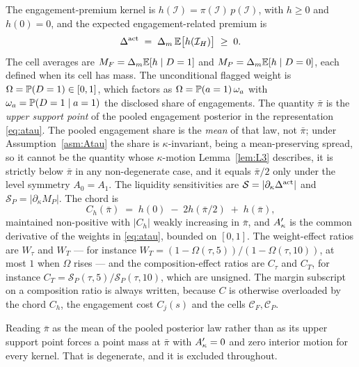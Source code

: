 \begin{definition}
\label{def:premium}
The engagement-premium kernel is $h(\mathcal I) = \pi(\mathcal I)\,p(\mathcal I)$, with $h \ge 0$ and
$h(0) = 0$, and the expected engagement-related premium is
\begin{equation}
\label{eq:Dact}
\Delta^{\mathrm{act}} \;=\; \Delta_m\,\mathbb{E}\bigl[h(\mathcal I_H)\bigr] \;\ge\; 0.
\end{equation}
The cell averages are $M_F = \Delta_m\mathbb{E}[h \mid D=1]$ and $M_P = \Delta_m\mathbb{E}[h \mid D=0]$, each
defined when its cell has mass. The unconditional flagged weight is $\Omega = \mathbb{P}(D=1) \in [0,1]$,
which factors as $\Omega = \mathbb{P}(a=1)\,\omega_a$ with $\omega_a = \mathbb{P}(D=1 \mid a=1)$ the disclosed
share of engagements. The quantity $\bar\pi$ is the \emph{upper support point} of the pooled
engagement posterior in the representation \eqref{eq:atau}. The pooled engagement share is the
\emph{mean} of that law, not $\bar\pi$; under Assumption~\ref{asm:Atau} the share is
$\kappa$-invariant, being a mean-preserving spread, so it cannot be the quantity whose
$\kappa$-motion Lemma~\ref{lem:L3} describes, it is strictly below $\bar\pi$ in any non-degenerate
case, and it equals $\bar\pi/2$ only under the level symmetry $A_0 = A_1$. The liquidity
sensitivities are $\mathcal S = |\partial_\kappa\Delta^{\mathrm{act}}|$ and $\mathcal S_P =
|\partial_\kappa M_P|$. The chord is
\begin{equation}
\label{eq:chord}
C_h(\bar\pi) \;=\; h(0) \;-\; 2h(\bar\pi/2) \;+\; h(\bar\pi),
\end{equation}
maintained non-positive with $|C_h|$ weakly increasing in $\bar\pi$, and $A'_{\kappa}$ is the common
derivative of the weights in \eqref{eq:atau}, bounded on $[0,1]$. The weight-effect ratios are
$W_\tau$ and $W_T$ --- for instance $W_T = (1-\Omega(\tau,5))/(1-\Omega(\tau,10))$, at most $1$ when
$\Omega$ rises --- and the composition-effect ratios are $C_\tau$ and $C_T$, for instance
$C_T = \mathcal S_P(\tau,5)/\mathcal S_P(\tau,10)$, which are unsigned. The margin subscript on a
composition ratio is always written, because $C$ is otherwise overloaded by the chord $C_h$, the
engagement cost $C_j(s)$ and the cells $\mathcal C_F,\mathcal C_P$.
\end{definition}

Reading $\bar\pi$ as the mean of the pooled posterior law rather than as its upper support point
forces a point mass at $\bar\pi$ with $A'_{\kappa} = 0$ and zero interior motion for every kernel. That is
degenerate, and it is excluded throughout.
